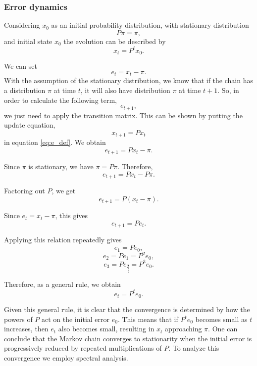 \subsubsection{Error dynamics}

Considering \(x_0\) as an initial probability distribution, with stationary distribution 
\[
P\pi=\pi,
\]
and initial state $x_0$ the evolution can be described by
\[
x_t = P^t x_0.
\]

We can set
\begin{equation}
e_t = x_t - \pi.\label{eq:e_def}
\end{equation}
With the assumption of the stationary distribution, we know that if the chain has a distribution \(\pi\) at time \(t\), it will also have distribution \(\pi\) at time \(t+1\). So, in order to calculate the following term,
\[
e_{t+1},
\]
we just need to apply the transition matrix. This can be shown by putting the update equation,
\[
x_{t+1}=Px_t
\]
in equation \ref{eq:e_def}.
We obtain
\[
e_{t+1}=Px_t-\pi.
\]

Since \(\pi\) is stationary, we have \(\pi=P\pi\). Therefore,
\[
e_{t+1}=Px_t-P\pi.
\]

Factoring out \(P\), we get
\[
e_{t+1}=P(x_t-\pi).
\]

Since \(e_t=x_t-\pi\), this gives
\[
e_{t+1}=Pe_t.
\]

Applying this relation repeatedly gives
\[
e_1=Pe_0,
\]
\[
e_2=Pe_1=P^2e_0,
\]
\[
e_3=Pe_2=P^3e_0.
\]
\[
\vdots
\]

Therefore, as a general rule, we obtain
\[
e_t=P^t e_0.
\]

Given this general rule, it is clear that the convergence is determined by how the powers of \(P\) act on the initial error \(e_0\). This means that if \(P^t e_0\) becomes small as \(t\) increases, then \(e_t\) also becomes small, resulting in \(x_t\) approaching \(\pi\). One can conclude that the Markov chain converges to stationarity when the initial error is progressively reduced by repeated multiplications of \(P\).
To analyze this convergence we employ spectral analysis.

